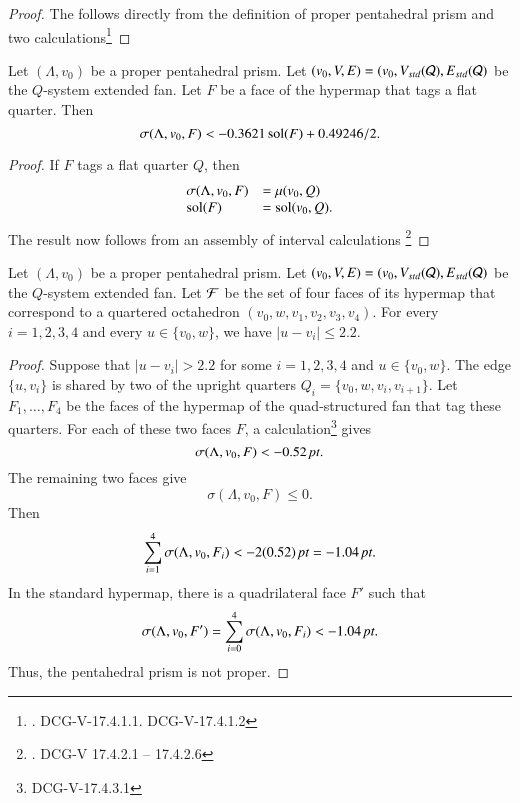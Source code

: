 \begin{proof}
The follows directly from the definition of proper pentahedral prism
and two calculations\footnote{ .  DCG-V-17.4.1.1. DCG-V-17.4.1.2}
\end{proof}

\begin{lemma}
Let $(\Lambda,v_0)$ be a proper pentahedral prism.
Let $(v_0,V,E) = (v_0,V_{std}({\mathcal Q}),E_{std}({\mathcal Q})$ be the $Q$-system
extended fan.  Let $F$ be a face of the
hypermap that
tags a
flat quarter.  Then
   $$\sigma(\Lambda,v_0,F) < -0.3621 \operatorname{sol}(F) + 0.49246/2.$$
\end{lemma}

\begin{proof} If $F$ tags a flat quarter $Q$, then
$$
\begin{array}{lll}
   \sigma(\Lambda,v_0,F) &= \mu(v_0,Q)  \\
   \operatorname{sol}(F) &= \operatorname{sol}(v_0,Q).
\end{array}
$$
The result now follows from an assembly of interval calculations%
\footnote{. DCG-V 17.4.2.1 -- 17.4.2.6}
\end{proof}

\begin{lemma}
Let $(\Lambda,v_0)$ be a proper pentahedral prism.  
Let $(v_0,V,E) = (v_0,V_{std}({\mathcal Q}),E_{std}({\mathcal Q})$ be the $Q$-system
extended fan.
Let ${\mathcal F}$ be the set
of four faces of its hypermap that correspond to a quartered octahedron
$(v_0,w,v_1,v_2,v_3,v_4)$.  For every $i=1,2,3,4$ and
every $u\in\{v_0,w\}$, we have $|u-v_i|\le 2.2$.  
\end{lemma}

\begin{proof}
Suppose that $|u-v_i|>2.2$ for some $i=1,2,3,4$ and $u\in\{v_0,w\}$.
The edge $\{u,v_i\}$ is shared by two of the upright quarters
$Q_i = \{v_0,w,v_i,v_{i+1}\}$.  Let $F_1,\ldots,F_4$ be the faces
of the hypermap of the quad-structured fan that tag these quarters.
For each of these two faces $F$, a
calculation\footnote{ DCG-V-17.4.3.1} gives 
  $$\sigma(\Lambda,v_0,F) < -0.52\,\hbox{\it pt}.$$
The remaining two faces give $$\sigma(\Lambda,v_0,F)\le 0.$$
Then $$\sum_{i=1}^4\sigma(\Lambda,v_0,F_i) < -2(0.52)\,\hbox{\it pt} = -1.04\,\hbox{\it pt}.$$
In the standard hypermap, there is a quadrilateral face $F'$ such that 
  $$\sigma(\Lambda,v_0,F') = \sum^4_{i=0}\sigma(\Lambda,v_0,F_i) <
   -1.04\,\hbox{\it pt}.$$
Thus, the pentahedral prism is not proper.
\end{proof}

